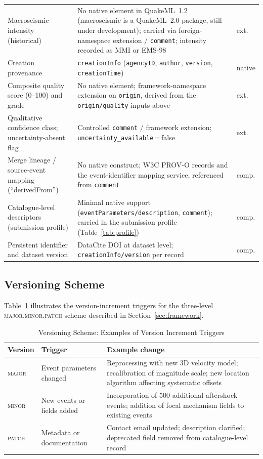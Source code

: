 \documentclass[11pt]{article}
\begin{document}
\begin{table}[H]
\begin{tabular}{p{3.5cm} p{8.2cm} p{1.5cm}}
Macroseismic intensity (historical) & No native element in QuakeML~1.2 (macroseismic is a QuakeML~2.0 package, still under development); carried via foreign-namespace extension / \texttt{comment}; intensity recorded as MMI or EMS-98 & \textsf{ext.} \\
Creation provenance & \texttt{creationInfo} (\texttt{agencyID}, \texttt{author}, \texttt{version}, \texttt{creationTime}) & \textsf{native} \\
Composite quality score (0--100) and grade & No native element; framework-namespace extension on \texttt{origin}, derived from the \texttt{origin/quality} inputs above & \textsf{ext.} \\
Qualitative confidence class; uncertainty-absent flag & Controlled \texttt{comment} / framework extension; \texttt{uncertainty\_available}\,=\,false & \textsf{ext.} \\
Merge lineage / source-event mapping (``derivedFrom'') & No native construct; W3C PROV-O records \citep{PROVO} and the event-identifier mapping service, referenced from \texttt{comment} & \textsf{comp.} \\
Catalogue-level descriptors (submission profile) & Minimal native support (\texttt{eventParameters/description}, \texttt{comment}); carried in the submission profile (Table~\ref{tab:profile}) & \textsf{comp.} \\
Persistent identifier and dataset version & DataCite DOI at dataset level; \texttt{creationInfo/version} per record & \textsf{comp.} \\
\bottomrule
\end{tabular}
\end{table}

\subsection{Versioning Scheme}
Table~\ref{tab:versioning} illustrates the version-increment triggers for the three-level \textsc{major.minor.patch} scheme described in Section~\ref{sec:framework}.

\begin{table}[H]
\centering
\small
\caption{Versioning Scheme: Examples of Version Increment Triggers}
\label{tab:versioning}
\setlength{\tabcolsep}{5pt}
\renewcommand{\arraystretch}{1.15}
\begin{tabular}{p{2cm} p{4cm} p{7cm}}
\toprule
\textbf{Version} & \textbf{Trigger} & \textbf{Example change} \\
\midrule
\textsc{major} & Event parameters changed & Reprocessing with new 3D velocity model; recalibration of magnitude scale; new location algorithm affecting systematic offsets \\
\textsc{minor} & New events or fields added & Incorporation of 500 additional aftershock events; addition of focal mechanism fields to existing events \\
\textsc{patch} & Metadata or documentation & Contact email updated; description clarified; deprecated field removed from catalogue-level record \\
\bottomrule
\end{tabular}
\end{table}
\end{document}
